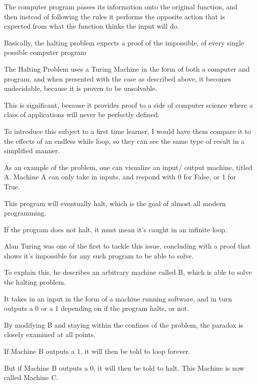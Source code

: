 \documentclass{article}
\begin{document}
\medskip\noindent
The computer program passes its information onto the original function, and then instead of following the rules it performs the opposite action that is expected from what the function thinks the input will do. 

\medskip\noindent
Basically, the halting problem expects a proof of the impossible, of every single possible computer program

\medskip\noindent
The Halting Problem uses a Turing Machine in the form of both a computer and program, and when presented with the case as described above, it becomes undecidable, because it is proven to be unsolvable. 

\medskip\noindent
This is significant, because it provides proof to a side of computer science where a class of applications will never be perfectly defined. 

\medskip\noindent
To introduce this subject to a first time learner, I would have them compare it to the effects of an endless while loop, so they can see the same type of result in a simplified manner. 

\medskip\noindent
As an example of the problem, one can visualize an input/ output machine, titled A. Machine A can only take in inputs, and respond with 0 for False, or 1 for True.

\medskip\noindent
This program will eventually halt, which is the goal of almost all modern programming. 

\medskip\noindent
If the program does not halt, it must mean it's caught in an infinite loop.

\medskip\noindent
Alan Turing was one of the first to tackle this issue, concluding with a proof that shows it's impossible for any such program to be able to solve.

\medskip\noindent
To explain this, he describes an arbitrary machine called B, which is able to solve the halting problem. 

\medskip\noindent
It takes in an input in the form of a machine running software, and in turn outputs a 0 or a 1 depending on if the program halts, or not.

\medskip\noindent
By modifying B and staying within the confines of the problem, the paradox is closely examined at all points. 

\medskip\noindent
If Machine B outputs a 1, it will then be told to loop forever. 

\medskip\noindent
But if Machine B outputs a 0, it will then be told to halt. This Machine is now called Machine C.
\end{document}
